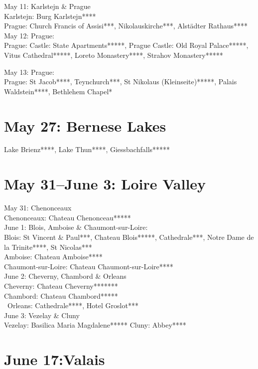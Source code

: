 May 11: Karlstejn \& Prague\\
Karlstejn: Burg Karlstejn****\\
Prague: Church Francis of Assisi***, Nikolauskirche***, Alst\"adter Rathaus****\\

May 12: Prague:\\
Prague: Castle: State Apartments*****, Prague Castle: Old Royal Palace*****, Vitus Cathedral*****, Loreto Monastery****, Strahov Monastery*****

May 13: Prague:\\
Prague: St Jacob****, Teynchurch***, St Nikolaus (Kleinseite)*****, Palais Waldstein****, Bethlehem Chapel*

\section{May 27: Bernese Lakes}
\label{Brienz2012}

Lake Brienz****, Lake Thun****, Giessbachfalls*****

\section{May 31--June 3: Loire Valley}
\label{2012Loire}

May 31: Chenonceaux\\
Chenonceaux: Chateau Chenonceau*****\\

June 1: Blois, Amboise \& Chaumont-sur-Loire:\\
Blois: St Vincent \& Paul***, Chateau Blois*****, Cathedrale***, Notre Dame de la Trinite****, St Nicolas***\\
Amboise: Chateau Amboise****\\
Chaumont-sur-Loire: Chateau Chaumont-sur-Loire****\\

June 2:  Cheverny, Chambord \& Orleans\\
Cheverny: Chateau Cheverny*******\\
Chambord: Chateau Chambord*****\\\
Orleans: Cathedrale****, Hotel Groslot***\\

June 3: Vezelay \& Cluny\\
Vezelay: Basilica Maria Magdalene*****
Cluny: Abbey****

\section{June 17:Valais}
\label{Valais2012}

